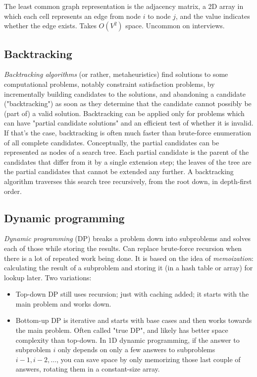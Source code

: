 \documentclass[8pt, table, xcdraw]{article}%
\begin{document}
The least common graph representation is the adjacency matrix, a 2D array in which each cell represents an edge from node $i$ to node $j$, and the value indicates whether the edge exists. Takes $O(V^2)$ space. Uncommon on interviews.

\subsection{Backtracking}

\emph{Backtracking algorithms} (or rather, metaheuristics) find solutions to some computational problems, notably constraint satisfaction problems, by incrementally building candidates to the solutions, and abandoning a candidate ("backtracking") as soon as they determine that the candidate cannot possibly be (part of) a valid solution. Backtracking can be applied only for problems which can have "partial candidate solutions" and an efficient test of whether it is invalid. If that's the case, backtracking is often much faster than brute-force enumeration of all complete candidates. Conceptually, the partial candidates can be represented as nodes of a search tree. Each partial candidate is the parent of the candidates that differ from it by a single extension step; the leaves of the tree are the partial candidates that cannot be extended any further. A backtracking algorithm traverses this search tree recursively, from the root down, in depth-first order.

\subsection{Dynamic programming}

\emph{Dynamic programming} (DP) breaks a problem down into subproblems and solves each of those while storing the results. Can replace brute-force recursion when there is a lot of repeated work being done. It is based on the idea of \emph{memoization}: calculating the result of a subproblem and storing it (in a hash table or array) for lookup later. Two variations:

\begin{itemize}
    \item Top-down DP still uses recursion; just with caching added; it starts with the main problem and works down.
    \item Bottom-up DP is iterative and starts with base cases and then works towards the main problem. Often called "true DP", and likely has better space complexity than top-down. In 1D dynamic programming, if the answer to subproblem $i$ only depends on only a few answers to subproblems $i-1, i-2, ...$, you can save space by only memorizing those last couple of answers, rotating them in a constant-size array.
\end{itemize}
\end{document}
